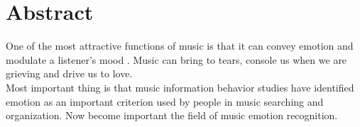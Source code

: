 \chapter{Abstract}
\label{Abstract}
\thispagestyle{empty}

\indent
One of the most attractive functions of music is that it can convey emotion and modulate a listener's mood \cite{feng2003popular}. Music can bring to tears, console us when we are grieving and drive us to love.
\\
Most important thing is that music information behavior studies have identified emotion as an important criterion used by people in music searching and organization. Now become important the field of music emotion recognition.

